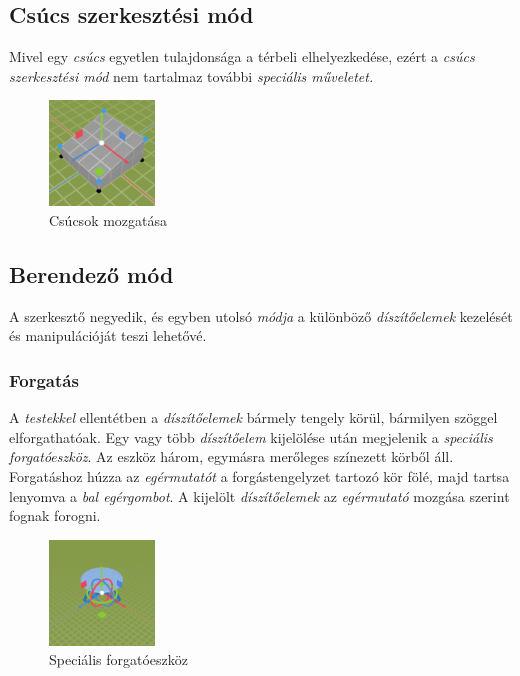 \pagebreak

\subsection{Csúcs szerkesztési mód}

Mivel egy \emph{csúcs} egyetlen tulajdonsága a térbeli elhelyezkedése, ezért a
\emph{csúcs szerkesztési mód} nem tartalmaz további \emph{speciális műveletet.}

\begin{figure}[h]
    \centering
    \includegraphics[width=0.25\textwidth]{parts/user-documentation/editor/images/vertices.png}
    \caption{Csúcsok mozgatása}
\end{figure}

\subsection{Berendező mód}

A szerkesztő negyedik, és egyben utolsó \emph{módja} a különböző \emph{díszítőelemek} kezelését és
manipulációját teszi lehetővé.

\subsubsection{Forgatás}

A \emph{testekkel} ellentétben a \emph{díszítőelemek} bármely tengely körül, bármilyen szöggel elforgathatóak. Egy vagy több \emph{díszítőelem} kijelölése után megjelenik a
\emph{speciális forgatóeszköz}. Az eszköz három, egymásra merőleges színezett körből áll.
Forgatáshoz húzza az \emph{egérmutatót} a forgástengelyzet tartozó kör fölé, majd tartsa lenyomva
a \emph{bal egérgombot}. A kijelölt \emph{díszítőelemek} az \emph{egérmutató} mozgása szerint
fognak forogni.

\begin{figure}[h]
    \centering
    \includegraphics[width=0.25\textwidth]{parts/user-documentation/editor/images/rotate_gizmo.png}
    \caption{Speciális forgatóeszköz}
\end{figure}

